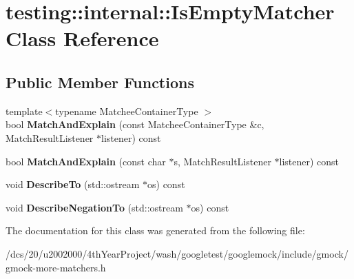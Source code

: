 \hypertarget{classtesting_1_1internal_1_1IsEmptyMatcher}{}\section{testing\+:\+:internal\+:\+:Is\+Empty\+Matcher Class Reference}
\label{classtesting_1_1internal_1_1IsEmptyMatcher}
\subsection*{Public Member Functions}
\begin{DoxyCompactItemize}
\item 
\mbox{\label{classtesting_1_1internal_1_1IsEmptyMatcher_a3d474f454894c58040998c12cade778c}} 
{\footnotesize template$<$typename Matchee\+Container\+Type $>$ }\\bool {\bfseries Match\+And\+Explain} (const Matchee\+Container\+Type \&c, Match\+Result\+Listener $\ast$listener) const
\item 
\mbox{\label{classtesting_1_1internal_1_1IsEmptyMatcher_aa65bc08676d63afc64f2a5a338029adb}} 
bool {\bfseries Match\+And\+Explain} (const char $\ast$s, Match\+Result\+Listener $\ast$listener) const
\item 
\mbox{\label{classtesting_1_1internal_1_1IsEmptyMatcher_af5ed93e9a882904c289d5199cf50b360}} 
void {\bfseries Describe\+To} (std\+::ostream $\ast$os) const
\item 
\mbox{\label{classtesting_1_1internal_1_1IsEmptyMatcher_aad3f827044d3416bbe3cbdeede1c0ec0}} 
void {\bfseries Describe\+Negation\+To} (std\+::ostream $\ast$os) const
\end{DoxyCompactItemize}


The documentation for this class was generated from the following file\+:\begin{DoxyCompactItemize}
\item 
/dcs/20/u2002000/4th\+Year\+Project/wash/googletest/googlemock/include/gmock/gmock-\/more-\/matchers.\+h\end{DoxyCompactItemize}
